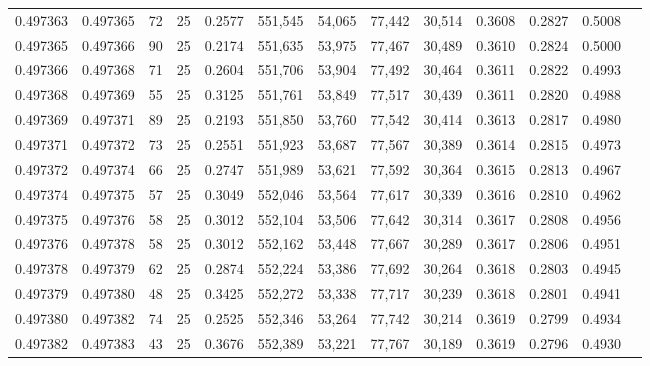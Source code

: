 \begin{tabular}{rrrrrrrrrrrrr}
0.497363 & 0.497365 &    72 &  25 &                                     0.2577 & 551,545 &  54,065 &  77,442 &  30,514 & 0.3608 & 0.2827 & 0.5008 \\
0.497365 & 0.497366 &    90 &  25 &                                     0.2174 & 551,635 &  53,975 &  77,467 &  30,489 & 0.3610 & 0.2824 & 0.5000 \\
0.497366 & 0.497368 &    71 &  25 &                                     0.2604 & 551,706 &  53,904 &  77,492 &  30,464 & 0.3611 & 0.2822 & 0.4993 \\
0.497368 & 0.497369 &    55 &  25 &                                     0.3125 & 551,761 &  53,849 &  77,517 &  30,439 & 0.3611 & 0.2820 & 0.4988 \\
0.497369 & 0.497371 &    89 &  25 &                                     0.2193 & 551,850 &  53,760 &  77,542 &  30,414 & 0.3613 & 0.2817 & 0.4980 \\
0.497371 & 0.497372 &    73 &  25 &                                     0.2551 & 551,923 &  53,687 &  77,567 &  30,389 & 0.3614 & 0.2815 & 0.4973 \\
0.497372 & 0.497374 &    66 &  25 &                                     0.2747 & 551,989 &  53,621 &  77,592 &  30,364 & 0.3615 & 0.2813 & 0.4967 \\
0.497374 & 0.497375 &    57 &  25 &                                     0.3049 & 552,046 &  53,564 &  77,617 &  30,339 & 0.3616 & 0.2810 & 0.4962 \\
0.497375 & 0.497376 &    58 &  25 &                                     0.3012 & 552,104 &  53,506 &  77,642 &  30,314 & 0.3617 & 0.2808 & 0.4956 \\
0.497376 & 0.497378 &    58 &  25 &                                     0.3012 & 552,162 &  53,448 &  77,667 &  30,289 & 0.3617 & 0.2806 & 0.4951 \\
0.497378 & 0.497379 &    62 &  25 &                                     0.2874 & 552,224 &  53,386 &  77,692 &  30,264 & 0.3618 & 0.2803 & 0.4945 \\
0.497379 & 0.497380 &    48 &  25 &                                     0.3425 & 552,272 &  53,338 &  77,717 &  30,239 & 0.3618 & 0.2801 & 0.4941 \\
0.497380 & 0.497382 &    74 &  25 &                                     0.2525 & 552,346 &  53,264 &  77,742 &  30,214 & 0.3619 & 0.2799 & 0.4934 \\
0.497382 & 0.497383 &    43 &  25 &                                     0.3676 & 552,389 &  53,221 &  77,767 &  30,189 & 0.3619 & 0.2796 & 0.4930 \\

\end{tabular}
